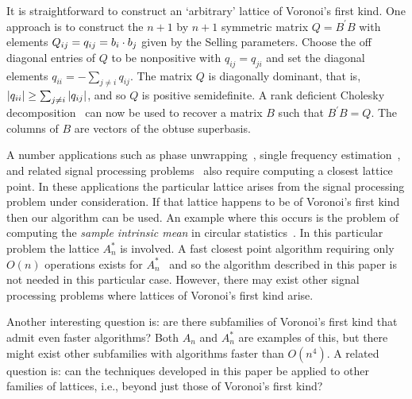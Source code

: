 \documentclass[final,leqno]{siamltex}
\begin{document}
It is straightforward to construct an `arbitrary' lattice of Voronoi's first kind.  One approach is to construct the $n+1$ by $n+1$ symmetric matrix $Q = B^\prime B$ with elements $Q_{ij} = q_{ij} = b_{i} \cdot b_j$ given by the Selling parameters.  Choose the off diagonal entries of $Q$ to be nonpositive with $q_{ij}=q_{ji}$ and set the diagonal elements $q_{ii} = -\sum_{j \neq i} q_{ij}$.  %
The matrix $Q$ is diagonally dominant, that is, ${\left| q_{ii} \right|} \geq \sum_{j \neq i} {\left| q_{ij} \right|}$, and so $Q$ is positive semidefinite.  A rank deficient Cholesky decomposition~\cite{Higham90analysisof} can now be used to recover a matrix $B$ such that $B^\prime B  = Q$. The columns of $B$ are vectors of the obtuse superbasis.

A number applications such as phase unwrapping~\cite{Teunissen_GPS_1995,Hassibi_GPS_1998}, single frequency estimation~\cite{McKilliamFrequencyEstimationByPhaseUnwrapping2009}, and related signal processing problems~\cite{McKilliam2007,Clarkson2007,McKilliam2009IndentifiabliltyAliasingPolyphase,Quinn_sparse_noisy_SSP_2012} also require computing a closest lattice point.  In these applications the particular lattice arises from the signal processing problem under consideration.  If that lattice happens to be of Voronoi's first kind then our algorithm can be used.  An example where this occurs is the problem of computing the \emph{sample intrinsic mean} in circular statistics~\cite{McKilliam_mean_dir_est_sq_arc_length2010}.  In this particular problem the lattice $A_n^*$ is involved.  A fast closest point algorithm requiring only $O(n)$ operations exists for $A_n^*$~\cite{McKilliam2009CoxeterLattices,McKilliam2008} and so the algorithm described in this paper is not needed in this particular case.  However, there may exist other signal processing problems where lattices of Voronoi's first kind arise.

Another interesting question is: are there subfamilies of Voronoi's first kind that admit even faster algorithms?  Both $A_n$ and $A_n^*$ are examples of this, but there might exist other subfamilies with algorithms faster than $O(n^4)$.  A related question is: can the techniques developed in this paper be applied to other families of lattices, i.e., beyond just those of Voronoi's first kind?  %
\end{document}

